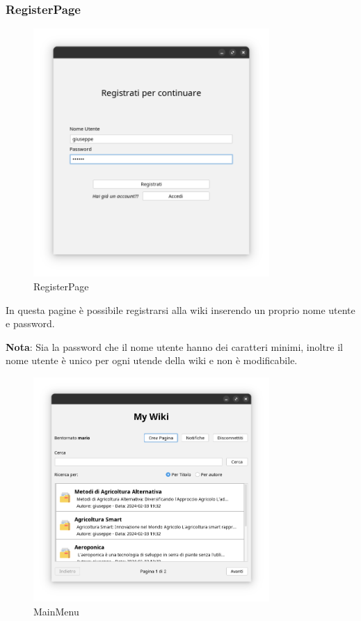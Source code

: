 \documentclass{article}
\begin{document}
	\newpage
	
	\subsubsection{RegisterPage}
	
	\begin{figure}[htbp]
		\centering
		\includegraphics[width=0.8\textwidth,height=0.8\textheight,keepaspectratio]{register_page.png}
		\caption{RegisterPage}
		\label{fig:2}
	\end{figure}
	
	In questa pagine \`e possibile registrarsi alla wiki inserendo un proprio nome utente e password.
	
	\textbf{Nota}: Sia la password che il nome utente hanno dei caratteri minimi, inoltre il nome utente \`e unico per ogni utende della wiki e non \`e modificabile.
	
	\newpage
	
	\begin{figure}[htbp]
		\centering
		\includegraphics[width=0.8\textwidth,height=0.8\textheight,keepaspectratio]{ main_menu.png}
		\caption{MainMenu}
		\label{fig:3}
	\end{figure}
	
\end{document}
